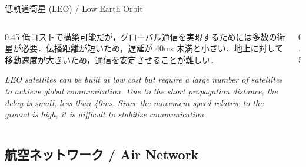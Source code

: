 \documentclass[11pt, aspectratio=169]{beamer}
\begin{document}
\begin{frame}[c]{低軌道衛星 (LEO) / Low Earth Orbit}
  \begin{columns}[c]
    \begin{column}{0.45\textwidth}
      低コストで構築可能だが，グローバル通信を実現するためには多数の衛星が必要．伝播距離が短いため，遅延が 40ms 未満と小さい．地上に対して移動速度が大きいため，通信を安定させることが難しい．

      \vspace{1em}
      \textit{LEO satellites can be built at low cost but require a large number of satellites to achieve global communication. Due to the short propagation distance, the delay is small, less than 40ms. Since the movement speed relative to the ground is high, it is difficult to stabilize communication.}
    \end{column}

    \begin{column}{0.5\textwidth}
      \begin{center}
      \end{center}
    \end{column}
  \end{columns}
\end{frame}

\subsection{航空ネットワーク / Air Network}
\end{document}
